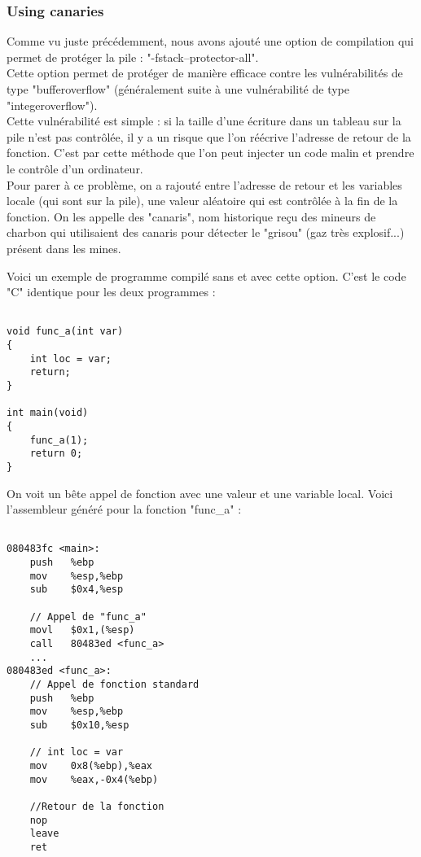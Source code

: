 \subsubsection{Using canaries}
Comme vu juste précédemment, nous avons ajouté une option de compilation qui permet de protéger la pile : "-fstack--protector-all". \\
Cette option permet de protéger de manière efficace contre les vulnérabilités de type "bufferoverflow" (généralement suite à une vulnérabilité de type "integeroverflow"). \\

Cette vulnérabilité est simple : si la taille d'une écriture dans un tableau  sur la pile n'est pas contrôlée, il y a un risque que l'on réécrive l'adresse de retour de la fonction. C'est par cette méthode que l'on peut injecter un code malin et prendre le contrôle d'un ordinateur. \\
Pour parer à ce problème, on a rajouté entre l'adresse de retour et les variables locale (qui sont sur la pile), une valeur aléatoire qui est contrôlée à la fin de la fonction. On les appelle des "canaris", nom historique reçu des mineurs de charbon qui utilisaient des canaris pour détecter le "grisou" (gaz très explosif...) présent dans les mines. 

Voici un exemple de programme compilé sans et avec cette option. C'est le code "C" identique pour les deux programmes :
\begin{lstlisting}[frame=single,style=C]  % Start your code-block

void func_a(int var)
{
	int loc = var;
	return;
}

int main(void)
{
	func_a(1);
	return 0;
}
\end{lstlisting}

On voit un bête appel de fonction avec une valeur et une variable local. Voici l'assembleur généré pour la fonction "func\_a" :
\begin{lstlisting}[frame=single,style=C]  % Start your code-block

080483fc <main>:
	push   %ebp
	mov    %esp,%ebp
	sub    $0x4,%esp
	
	// Appel de "func_a"
	movl   $0x1,(%esp)
	call   80483ed <func_a>
	... 
080483ed <func_a>:
	// Appel de fonction standard
	push   %ebp
	mov    %esp,%ebp
	sub    $0x10,%esp
	
	// int loc = var
	mov    0x8(%ebp),%eax
	mov    %eax,-0x4(%ebp)
	
	//Retour de la fonction
	nop
	leave  
	ret  
\end{lstlisting}


